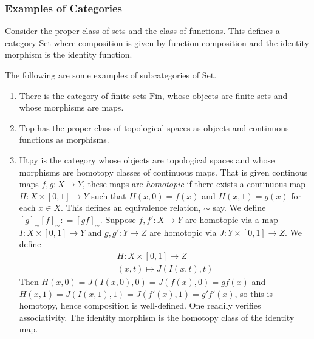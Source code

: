 \subsubsection{Examples of Categories}
\begin{example}
    Consider the proper class of sets and the class of functions. This defines a category $\mathrm{Set}$ where composition is given by function composition and the identity morphism is the identity function.  
\end{example}
\begin{example}
    The following are some examples of subcategories of $\mathrm{Set}$.
    \begin{enumerate}  
        \item There is the category of finite sets $\mathrm{Fin}$, whose objects are finite sets and whose morphisms are maps. 
        \item $\mathrm{Top}$ has the proper class of topological spaces as objects and continuous functions as morphisms.
        \item $\mathrm{Htpy}$ is the category whose objects are topological spaces and whose morphisms are homotopy classes of continuous maps. That is given continous maps $f,g: X\rightarrow Y$, these maps are \emph{homotopic} if there exists a continuous map $H: X\times [0,1]\rightarrow Y$ such that $H(x,0)=f(x)$ and $H(x,1)=g(x)$ for each $x\in X$. This defines an equivalence relation, $\sim$ say. We define $[g]_\sim[f]_\sim: = [gf]_\sim$. Suppose $f,f': X\rightarrow Y$ are homotopic via a map $I : X\times [0,1]\rightarrow Y$  and $g,g': Y\rightarrow Z$ are homotopic via $J: Y\times [0,1]\rightarrow Z$. We define 
        \begin{gather*}
            H : X\times[0,1] \rightarrow Z\\
            (x,t) \mapsto J(I(x,t),t)
        \end{gather*} 
        Then $H(x,0)= J(I(x,0),0)=J(f(x),0)=gf(x)$ and $H(x,1)=J(I(x,1),1)=J(f'(x),1)=g'f'(x)$, so this is homotopy, hence composition is well-defined. One readily verifies associativity. The identity morphism is the homotopy class of the identity map. 

\end{enumerate}
\end{example}
